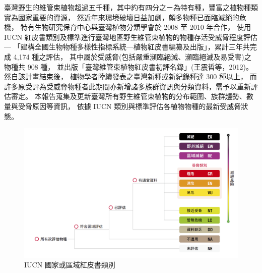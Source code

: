 \begin{multicols}{2}
臺灣野生的維管束植物超過五千種，其中約有四分之ㄧ為特有種，豐富之植物種類實為國家重要的資源，
然近年來環境破壞日益加劇，頗多物種已面臨滅絕的危機，
特有生物研究保育中心與臺灣植物分類學會於 2008 至 2010 年合作，
使用 IUCN 紅皮書類別及標準進行臺灣地區野生維管束植物的物種存活受威脅程度評估---
「建構全國生物物種多樣性指標系統---植物紅皮書編纂及出版」，累計三年共完成 4,174 種之評估，
其中屬於受威脅(包括嚴重瀕臨絕滅、瀕臨絕滅及易受害)之物種共 908 種，
並出版「臺灣維管束植物紅皮書初評名錄」(王震哲等，2012)。然自該計畫結束後，
植物學者陸續發表之臺灣新種或新紀錄種達 300 種以上，
而許多原受評為受威脅物種者此期間亦新增諸多族群資訊與分類資料，需予以重新評估審定。
本報告蒐集及更新臺灣所有野生維管束植物的分布範圍、族群趨勢、數量與受脅原因等資訊，
依據 IUCN 類別與標準評估各植物物種的最新受威脅狀態。\\
\end{multicols}
\begin{figure}[!ht]
    \includegraphics[width=\textwidth]{images/fig1.png}
    \caption{IUCN 國家或區域紅皮書類別} \label{fig1}
\end{figure}

%
